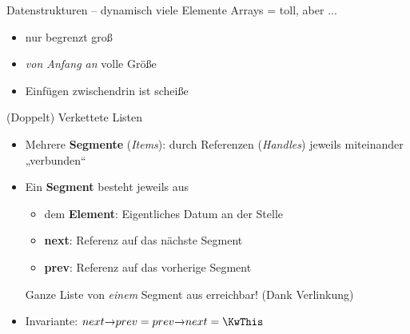 



\date{19. Mai \thisyear}



	
	
	\begin{frame}
		\titlepage
	\end{frame}
	
	
\begin{frame}{Datenstrukturen – dynamisch viele Elemente}
	Arrays = toll, aber ...
		\pause
		\begin{itemize}
			\item[\Cons] nur begrenzt groß
			\pause
			\item[\Cons] \emph{von Anfang an} volle Größe
			\pause
			\item[\Cons] Einfügen zwischendrin ist scheiße
		\end{itemize}
\end{frame}

\begin{frame}{(Doppelt) Verkettete Listen}
	\begin{itemize}
		\item Mehrere \textbf{Segmente} (\emph{Items}): durch Referenzen  (\emph{Handles}) jeweils miteinander „verbunden“
		\pause
		\item Ein \textbf{Segment} besteht jeweils aus
		\begin{itemize}
			\item dem \textbf{Element}: Eigentliches Datum an der Stelle
			\pause
			\item \textbf{next}: Referenz auf das nächste Segment
			\pause
			\item \textbf{prev}: Referenz auf das vorherige Segment
		\end{itemize}
		\pause
		\implitem Ganze Liste von \textit{einem} Segment aus erreichbar! (Dank Verlinkung)
		\pause 
		\item Invariante: $next \access prev = prev \access next = \KwThis$
	\end{itemize}
\end{frame}

